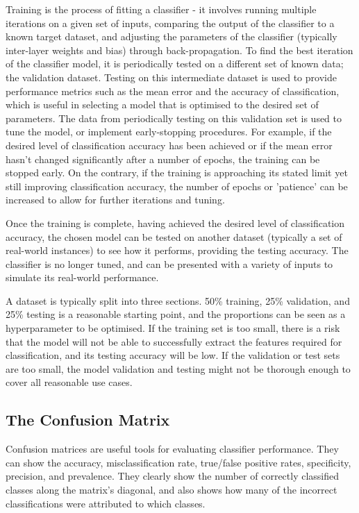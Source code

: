 Training is the process of fitting a classifier - it involves running multiple iterations on a given set of inputs, comparing the output of the classifier to a known target dataset, and adjusting the parameters of the classifier (typically inter-layer weights and bias) through back-propagation. To find the best iteration of the classifier model, it is periodically tested on a different set of known data; the validation dataset. Testing on this intermediate dataset is used to provide performance metrics such as the mean error and the accuracy of classification, which is useful in selecting a model that is optimised to the desired set of parameters. The data from periodically testing on this validation set is used to tune the model, or implement early-stopping procedures. For example, if the desired level of classification accuracy has been achieved or if the mean error hasn't changed significantly after a number of epochs, the training can be stopped early. On the contrary, if the training is approaching its stated limit yet still improving classification accuracy, the number of epochs or 'patience' can be increased to allow for further iterations and tuning.

Once the training is complete, having achieved the desired level of classification accuracy, the chosen model can be tested on another dataset (typically a  set of real-world instances) to see how it performs, providing the testing accuracy. The classifier is no longer tuned, and can be presented with a variety of inputs to simulate its real-world performance.

A dataset is typically split into three sections. 50\% training, 25\% validation, and 25\% testing is a reasonable starting point, and the proportions can be seen as a hyperparameter to be optimised. If the training set is too small, there is a risk that the model will not be able to successfully extract the features required for classification, and its testing accuracy will be low. If the validation or test sets are too small, the model validation and testing might not be thorough enough to cover all reasonable use cases.

\subsection{The Confusion Matrix}
Confusion matrices are useful tools for evaluating classifier performance. They can show the accuracy, misclassification rate, true/false positive rates, specificity, precision, and prevalence. They clearly show the number of correctly classified classes along the matrix's diagonal, and also shows how many of the incorrect classifications were attributed to which classes. 

